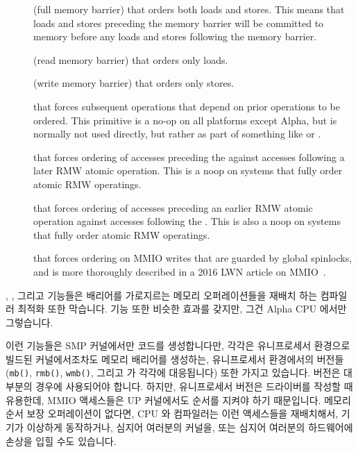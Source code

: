 \begin{description}
\item	[] (full memory barrier) that orders both loads and
	stores.
	This means that loads and stores preceding the memory barrier
	will be committed to memory before any loads and stores
	following the memory barrier.
\item	[] (read memory barrier) that orders only loads.
\item	[] (write memory barrier) that orders only stores.
\item	[] that forces subsequent operations
	that depend on prior operations to be ordered.
	This primitive is a no-op on all platforms except Alpha, but
	is normally not used directly, but rather as part of
	something like  or .
\item	[] that forces ordering of accesses
	preceding the  against accesses following
	a later RMW atomic operation.
	This is a noop on systems that fully order atomic RMW operatings.
\item	[] that forces ordering of accesses
	preceding an earlier RMW atomic operation against accesses
	following the .
	This is also a noop on systems that fully order atomic RMW operatings.
\item	[] that forces ordering on MMIO writes that are guarded
	by global spinlocks, and is more thoroughly described
	in a 2016 LWN article on MMIO~\cite{PaulEMcKenney2016LinuxKernelMMIO}.
\fi
\end{description}
, , 그리고  기능들은 배리어를
가로지르는 메모리 오퍼레이션들을 재배치 하는 컴파일러 최적화 또한 막습니다.
 기능 또한 비슷한 효과를 갖지만, 그건 Alpha CPU
에서만 그렇습니다.

이런 기능들은 SMP 커널에서만 코드를 생성합니다만, 각각은 유니프로세서 환경으로
빌드된 커널에서조차도 메모리 배리어를 생성하는, 유니프로세서 환경에서의 버전들
({\tt mb()}, {\tt rmb()}, {\tt wmb()}, 그리고  가
각각에 대응됩니다) 또한 가지고 있습니다.
 버전은 대부분의 경우에 사용되어야 합니다.
하지만, 유니프로세서 버전은 드라이버를 작성할 때 유용한데, MMIO 액세스들은 UP
커널에서도 순서를 지켜야 하기 때문입니다.
메모리 순서 보장 오퍼레이션이 없다면, CPU 와 컴파일러는 이런 액세스들을
재배치해서, 기기가 이상하게 동작하거나, 심지어 여러분의 커널을, 또는 심지어
여러분의 하드웨어에 손상을 입힐 수도 있습니다.
\iffalse

